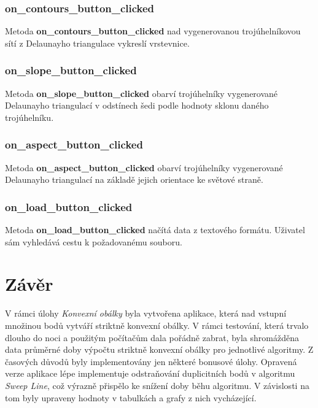 \documentclass[a4paper, 12pt]{article}
\begin{document}
\subsubsection*{on\_contours\_button\_clicked}
Metoda \textbf{on\_contours\_button\_clicked} nad vygenerovanou trojúhelníkovou sítí z Delaunayho triangulace vykreslí vrstevnice. 

\subsubsection*{on\_slope\_button\_clicked}
Metoda \textbf{on\_slope\_button\_clicked} obarví trojúhelníky vygenerované Delaunayho triangulací v odstínech šedi podle hodnoty sklonu daného trojúhelníku.

\subsubsection*{on\_aspect\_button\_clicked}
Metoda \textbf{on\_aspect\_button\_clicked} obarví trojúhelníky vygenerované Delaunayho triangulací na základě jejich orientace  ke světové straně.

\subsubsection*{on\_load\_button\_clicked}
Metoda \textbf{on\_load\_button\_clicked} načítá data z textového formátu. Uživatel sám vyhledává cestu k požadovanému souboru.


\clearpage
\section{Závěr}
V rámci úlohy \textit{Konvexní obálky} byla vytvořena aplikace, která nad vstupní množinou bodů vytváří striktně konvexní obálky. V rámci testování, která trvalo dlouho do noci a použitým počítačům dala pořádně zabrat, byla shromážděna data průměrné doby výpočtu striktně konvexní obálky pro jednotlivé algoritmy. Z časových důvodů byly implementovány jen některé bonusové úlohy. Opravená verze aplikace lépe implementuje odstraňo\-vá\-ní duplicitních bodů v algoritmu \textit{Sweep Line}, což výrazně přispělo ke snížení doby běhu algoritmu. V závislosti na tom byly upraveny hodnoty v tabulkách a grafy z nich vycházející.\\
\end{document}
